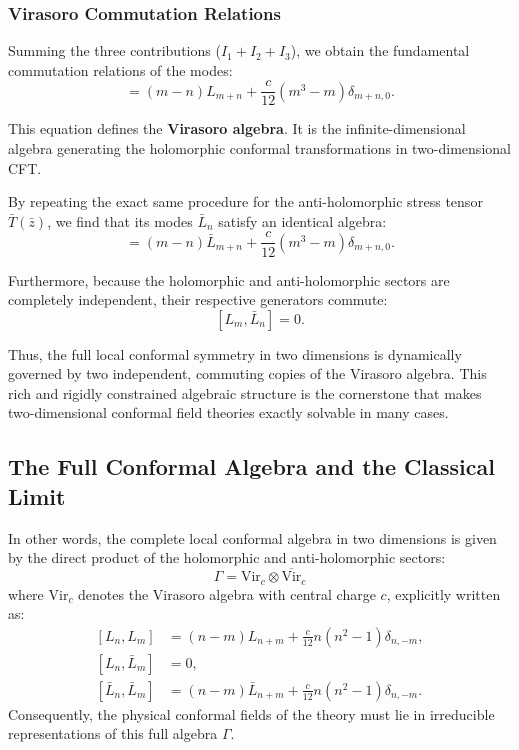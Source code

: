 \subsubsection{Virasoro Commutation Relations}

Summing the three contributions (\(I_1 + I_2 + I_3\)), we obtain the fundamental commutation relations of the modes:
\begin{equation}
    [L_m, L_n] = (m-n) L_{m+n} + \frac{c}{12} (m^3 - m) \delta_{m+n, 0}.
    \label{eq:virasoro_algebra}
\end{equation}

This equation defines the \textbf{Virasoro algebra}. It is the infinite-dimensional algebra generating the holomorphic conformal transformations in two-dimensional CFT.

By repeating the exact same procedure for the anti-holomorphic stress tensor \(\bar{T}(\bar{z})\), we find that its modes \(\bar{L}_n\) satisfy an identical algebra:
\begin{equation}
    [\bar{L}_m, \bar{L}_n] = (m-n) \bar{L}_{m+n} + \frac{c}{12} (m^3 - m) \delta_{m+n, 0}.
    \label{eq:anti-holomorphic_virasoro_algebra}
\end{equation}

Furthermore, because the holomorphic and anti-holomorphic sectors are completely independent, their respective generators commute:
\[
    [L_m, \bar{L}_n] = 0.
\]

Thus, the full local conformal symmetry in two dimensions is dynamically governed by two independent, commuting copies of the Virasoro algebra. This rich and rigidly constrained algebraic structure is the cornerstone that makes two-dimensional conformal field theories exactly solvable in many cases.

\subsection{The Full Conformal Algebra and the Classical Limit}

In other words, the complete local conformal algebra in two dimensions is given by the direct product of the holomorphic and anti-holomorphic sectors:
\[
    \Gamma = \text{Vir}_c \otimes \overline{\text{Vir}}_c
\]
where \(\text{Vir}_c\) denotes the Virasoro algebra with central charge \(c\), explicitly written as:
\begin{equation}
    \begin{aligned}
        [L_n, L_m]             & = (n-m)L_{n+m} + \frac{c}{12}n(n^2-1)\delta_{n,-m},       \\
        [L_n, \bar{L}_m]       & = 0,                                                      \\
        [\bar{L}_n, \bar{L}_m] & = (n-m)\bar{L}_{n+m} + \frac{c}{12}n(n^2-1)\delta_{n,-m}.
    \end{aligned}
    \label{eq:full_virasoro_algebra}
\end{equation}
Consequently, the physical conformal fields of the theory must lie in irreducible representations of this full algebra \(\Gamma\).


